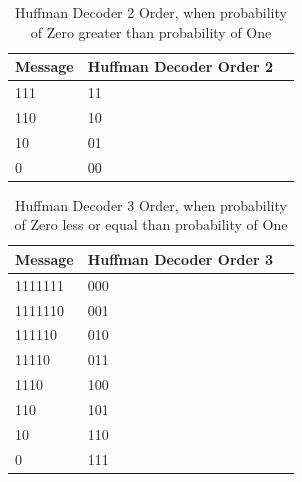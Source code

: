 \begin{refsection}
\begin{table}[H]
\begin{tabular}{|l|l|l|}
\end{tabular}
\end{table}

\begin{table}[H]
\centering
\caption{Huffman Decoder 2 Order, when probability of Zero greater than probability of One}
\label{tb:hufmmandecoder3}
\begin{tabular}{|l|l|l|}
\hline
\textbf{Message}                      & \textbf{Huffman Decoder Order 2}                                       \\ \hline
111         &11                                                          \\ \hline
110         &10                                                        \\ \hline
10           &01                                               \\ \hline
0             &00                                       \\ \hline

\end{tabular}
\end{table}


\begin{table}[H]
\centering
\caption{Huffman Decoder 3 Order, when probability of Zero less or equal than probability of One}
\label{tb:hufmmandecoder4}
\begin{tabular}{|l|l|l|}
\hline
\textbf{Message}                      & \textbf{Huffman Decoder Order 3}                                       \\ \hline
1111111    & 000                                                      \\ \hline
1111110    & 001                                                     \\ \hline
111110      & 010                                                   \\ \hline
11110        & 011                                          \\ \hline
1110          & 100                                               \\ \hline
110            & 101                                             \\ \hline
10              & 110                                          \\ \hline
0                & 111                                         \\ \hline
\end{tabular}
\end{table}


\end{refsection}
